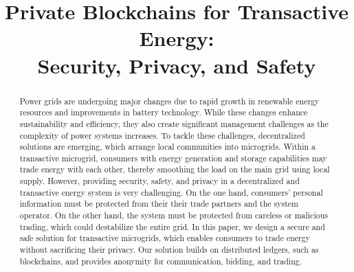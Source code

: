 \documentclass[chi_draft]{sigchi}
\def\plaintitle{Private Blockchains for Transactive Energy:\\Security, Privacy, and Safety}
\begin{document}
\allowdisplaybreaks

\title{\plaintitle}

\author{%
}

\maketitle

\begin{abstract}
Power grids are undergoing major changes due to rapid growth in renewable energy resources and improvements in battery technology.
While these changes enhance sustainability and efficiency, they also create significant management challenges as the complexity of power systems increases.
To tackle these challenges, decentralized solutions are emerging, which arrange local communities into microgrids.
Within a transactive microgrid, consumers with energy generation and storage capabilities may trade energy with each other, thereby smoothing the load on the main grid using local supply.
However, providing security, safety, and privacy in a decentralized and transactive energy system is very challenging.
On the one hand, consumers' personal information must be protected from their their trade partners and the system operator.
On the other hand, the system must be protected from careless or malicious trading, which could destabilize the entire grid. 
In this paper, we design a secure and safe solution for transactive microgrids, which enables consumers to trade energy without sacrificing their privacy.
Our solution builds on distributed ledgers, such as blockchains, and provides anonymity for communication, bidding, and trading.
\end{abstract}
\end{document}
